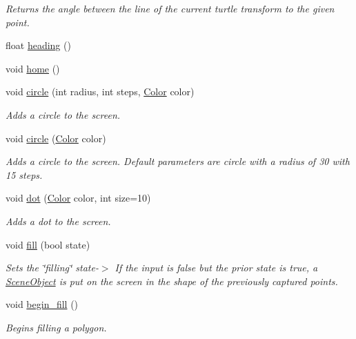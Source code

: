 \begin{DoxyCompactItemize}
\begin{DoxyCompactList}\small\item\em Returns the angle between the line of the current turtle transform to the given point. \end{DoxyCompactList}\item 
float \hyperlink{classcturtle_1_1Turtle_a5c90aa6dea03e88f202dcadc4ff77354}{heading} ()
\item 
void \hyperlink{classcturtle_1_1Turtle_ab6558ff8b547bfb54a68c55259f7bb32}{home} ()
\item 
void \hyperlink{classcturtle_1_1Turtle_a6ce4e8065581887d006f420d0e93967e}{circle} (int radius, int steps, \hyperlink{classcturtle_1_1Color}{Color} color)
\begin{DoxyCompactList}\small\item\em Adds a circle to the screen. \end{DoxyCompactList}\item 
void \hyperlink{classcturtle_1_1Turtle_a1f945648941a632ed33d28e9c51b8207}{circle} (\hyperlink{classcturtle_1_1Color}{Color} color)
\begin{DoxyCompactList}\small\item\em Adds a circle to the screen. Default parameters are circle with a radius of 30 with 15 steps. \end{DoxyCompactList}\item 
void \hyperlink{classcturtle_1_1Turtle_af33a02ec769c35671204abcc33050b0f}{dot} (\hyperlink{classcturtle_1_1Color}{Color} color, int size=10)
\begin{DoxyCompactList}\small\item\em Adds a dot to the screen. \end{DoxyCompactList}\item 
void \hyperlink{classcturtle_1_1Turtle_a7026fc9ad563b91b5a7a168718e91d6f}{fill} (bool state)
\begin{DoxyCompactList}\small\item\em Sets the \char`\"{}filling\char`\"{} state-\/$>$ If the input is false but the prior state is true, a \hyperlink{structcturtle_1_1SceneObject}{Scene\+Object} is put on the screen in the shape of the previously captured points. \end{DoxyCompactList}\item 
void \hyperlink{classcturtle_1_1Turtle_a5d441494084c38e8947205a19f70ce73}{begin\+\_\+fill} ()
\begin{DoxyCompactList}\small\item\em Begins filling a polygon. \end{DoxyCompactList}\item 

\end{DoxyCompactItemize}

